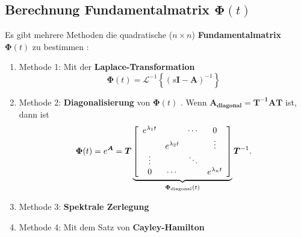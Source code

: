 \subsection{Berechnung Fundamentalmatrix $\boldsymbol{\Phi}(t)$}
Es gibt mehrere Methoden die quadratische ($n\times n$) {\bf Fundamentalmatrix} $\boldsymbol{\Phi}(t)$  zu bestimmen \cite{HSU:95, UNB:89}:\\
\begin{enumerate}
 \item[]Methode 1:  Mit der {\bf Laplace-Transformation} \cite{HSU:95, UNB:89} 
\begin{equation*}
\boldsymbol{\Phi}(t)=\mathcal{L}^{-1}\left\{ (s\boldsymbol{I}-\boldsymbol{A})^{-1}   \right\}
\end{equation*}
 \item[]Methode 2: {\bf Diagonalisierung} von $\boldsymbol{\Phi}(t)$ \cite{HSU:95, UNB:89}. Wenn $\boldsymbol{A_{\text{diagonal}}}=\boldsymbol{T^{-1}AT}$ ist, dann ist
\begin{equation*}
\boldsymbol{\Phi}(t)=e^{\boldsymbol{A}}=\boldsymbol{T}\underbrace{\left [ 
\begin{array}{c c c c}
e^{\lambda_1 t} & & \cdots & 0\\
 & e^{\lambda_2 t} & &\vdots \\
 \vdots & & \ddots & \\
 0 & \cdots& & e^{\lambda_n t}\\
\end{array}
\right ]
}_{\boldsymbol{\Phi}_\text{diagonal}(t)}\boldsymbol{T}^{-1}.
\end{equation*}
 \item[]Methode 3: {\bf Spektrale Zerlegung} \cite{HSU:95, UNB:89}
 \item[]Methode 4: Mit dem Satz von {\bf Cayley-Hamilton} \cite{HSU:95, UNB:89}
\end{enumerate}

